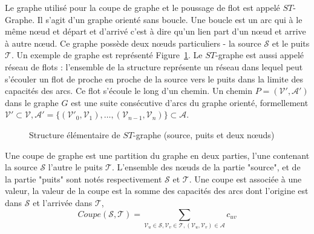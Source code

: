 \documentclass[../main/These_Mathias_Paget.tex]{subfiles}
\begin{document}
	Le graphe utilisé pour la coupe de graphe et le poussage de flot est appelé  $ST$-Graphe. Il s'agit d'un graphe orienté sans boucle. Une boucle est un arc qui à le même nœud et départ et d'arrivé c'est à dire qu'un lien part d'un nœud et arrive à autre nœud. Ce graphe possède deux nœuds particuliers - la source $\mathcal{S}$ et le puits $\mathcal{T}$. Un exemple de graphe est représenté Figure~\ref{fig:struct_elem}. Le $ST$-graphe est aussi appelé réseau de flots : l'ensemble de la structure représente un réseau dans lequel peut s'écouler un flot de proche en proche de la source vers le puits dans la limite des capacités des arcs. Ce flot s’écoule le long d'un chemin. Un chemin $P=(\boldsymbol{\mathcal{V'}},\boldsymbol{\mathcal{A'}})$ dans le graphe $G$ est une suite consécutive d'arcs du graphe orienté, formellement $\boldsymbol{\mathcal{V'}} \subset \boldsymbol{\mathcal{V}}, \boldsymbol{\mathcal{A'}} = \{ (\mathcal{V'}_0, \mathcal{V}_1), \ldots , (\mathcal{V}_{n{-}1}, \mathcal{V}_n) \} \subset \boldsymbol{\mathcal{A}}$.	
	
\begin{figure}[h]
\begin{center}
\end{center}
\caption{Structure élémentaire de $ST$-graphe (source, puits et deux nœuds)}
\label{fig:struct_elem}
\end{figure}	
	
	Une coupe de graphe est une partition du graphe en deux parties, l'une contenant la source $\mathcal{S}$ l'autre le puits $\mathcal{T}$. L'ensemble des nœuds de la partie "source", et de la partie "puits" sont notés respectivement $\boldsymbol{\mathcal{S}}$ et $\boldsymbol{\mathcal{T}}$. Une coupe est associée à une valeur, la valeur de la coupe est la somme des capacités des arcs dont l'origine est dans $\boldsymbol{\mathcal{S}}$ et l'arrivée dans $\boldsymbol{\mathcal{T}}$,
	\begin{equation}
		Coupe(\boldsymbol{\mathcal{S}}, \boldsymbol{\mathcal{T}}) = \sum_{\mathcal{V}_u \in \boldsymbol{\mathcal{S}} , \mathcal{V}_v \in \boldsymbol{\mathcal{T}}, (\mathcal{V}_u,\mathcal{V}_v) \in \boldsymbol{\mathcal{A}}}{c_{uv}}
	\end{equation}
\end{document}
